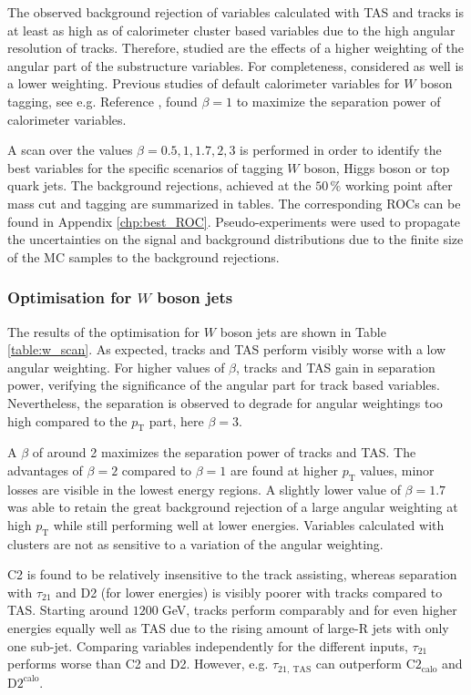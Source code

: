 The observed background rejection of variables calculated with TAS and tracks is at least as high as of calorimeter cluster based variables due to the high angular resolution of tracks. Therefore, studied are the effects of a higher weighting of the angular part of the substructure variables. For completeness, considered as well is a lower weighting. Previous studies of default calorimeter variables for $W$ boson tagging, see e.g. Reference \cite{bib:w_tagging}, found $\beta=1$ to maximize the separation power of calorimeter variables.

A scan over the values $\beta= 0.5, 1, 1.7, 2, 3$ is performed in order to identify the best variables for the specific scenarios of tagging $W$ boson, Higgs boson or top quark jets. The background rejections, achieved at the $50\,\%$ working point after mass cut and tagging are summarized in tables. The corresponding ROCs can be found in Appendix \ref{chp:best_ROC}. Pseudo-experiments were used to propagate the uncertainties on the signal and background distributions due to the finite size of the MC samples to the background rejections. 

\subsubsection{Optimisation for $W$ boson jets}
The results of the optimisation for $W$ boson jets are shown in Table \ref{table:w_scan}. As expected, tracks and TAS perform visibly worse with a low angular weighting. For higher values of $\beta$, tracks and TAS gain in separation power, verifying the significance of the angular part for track based variables. Nevertheless, the separation is observed to degrade for angular weightings too high compared to the $p_{\mathrm{T}}$ part, here $\beta=3$.

A $\beta$ of around 2 maximizes the separation power of tracks and TAS. The advantages of $\beta=2$ compared to $\beta=1$ are found at higher $p_{\mathrm{T}}$ values, minor losses are visible in the lowest energy regions. A slightly lower value of $\beta=1.7$ was able to retain the great background rejection of a large angular weighting at high $p_{\mathrm{T}}$ while still performing well at lower energies. Variables calculated with clusters are not as sensitive to a variation of the angular weighting.

C2 is found to be relatively insensitive to the track assisting, whereas separation with $\tau_{21}$ and D2 (for lower energies) is visibly poorer with tracks compared to TAS.  Starting around $1200\;$GeV, tracks perform comparably and for even higher energies equally well as TAS due to the rising amount of large-R jets with only one sub-jet. Comparing variables independently for the different inputs, $\tau_{21}$ performs worse than C2 and D2. However, e.g. $\tau_{21,\: \text{TAS}}$ can outperform $\text{C2}_{\text{calo}}$ and $\text{D2}^{\text{calo}}$.

